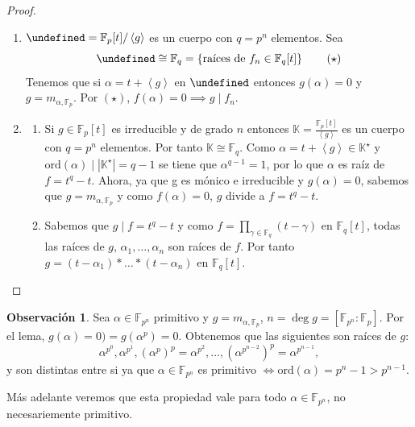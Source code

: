 \documentclass[10pt, spanish]{report}
\theoremstyle{definition}
\newtheorem*{obs}{Observación}
\newcommand{\F}{\mathbb{F}}
\newcommand{\K}{\mathbb{K}}
\let\L\undefined
\newcommand{\L}{\mathbb{L}}
\newcommand{\ord}[1]{\text{ord}(#1)}
\newcommand{\fecha}[1]{\marginpar{\underline{\footnotesize{#1}}}}
\begin{document}
\begin{proof}\hspace{0pt}
    \begin{enumerate}
        \item  $\L=\F_p[t]/\left<g\right>$  es un cuerpo con $q=p^n$ elementos.
            Sea
            \begin{equation}
                \L\cong\F_q=\left\{ \text{raíces de }f_n\in\F_q[t]\right\}
                \tag{$\star$}
            \end{equation}
            Tenemos que si $\alpha=t+\left< g \right> $ en $\L$ entonces
            $g(\alpha)=0$ y $g=m_{\alpha,\F_p}$. Por $\left( \star \right)$,
            $f(\alpha)=0\implies g\mid f_n$.
        \item
            \begin{enumerate}
                \item Si $g\in\F_p[t]$ es irreducible y de grado $n$ entonces $\K=
                    \frac{\F_p[t]}{\left< g \right>}$ es un cuerpo con $q=p^n$
                    elementos. Por tanto $\K\cong\F_q$.
                    Como $\alpha=t+\left< g \right>\in\K^\star$ y
                    $\ord{\alpha}\mid\left| \K^\star\right|=q-1$ se tiene que
                    $\alpha^{q-1}=1$, por lo que $\alpha$ es raíz de $f=t^q-t$.
                    Ahora, ya que g es mónico e irreducible y $g(\alpha)=0$,
                    sabemos que $g=m_{\alpha,\F_p}$ y como $f(\alpha)=0$, $g$
                    divide a $f=t^q-t$.
                \item Sabemos que $g\mid f=t^q-t$ y como $f=\prod_{\gamma\in\F_q}(t-\gamma)$ en $\F_q[t]$,
                    todas las raíces de $g$, $\alpha_1,\ldots,\alpha_n$ son
                    raíces de $f$. Por tanto
                    $g=(t-\alpha_1)*\ldots*(t-\alpha_n)$ en $\F_q[t]$.
            \end{enumerate}
    \end{enumerate}
    \vspace{-1.75em}
\end{proof}

\fecha{18/03} %
\begin{obs}
    Sea $\alpha\in\F_{p^n}$ primitivo y $g=m_{\alpha,\F_p}$, $n=\deg{g}=\left[
    \F_{p^n}:\F_p\right]$. Por el lema, $g(\alpha)=0)=g(\alpha^p)=0$. Obtenemos
    que las siguientes son raíces de $g$: \[\alpha^{p^0},\alpha^{p^1},(\alpha^p)^p=
    \alpha^{p^2},\ldots,\left(\alpha^{p^{n-2}}\right)^p=\alpha^{p^{n-1}},\]
    y son distintas entre si ya que $\alpha\in\F_{p^{n}}$ es primitivo
    $\Leftrightarrow \ord{\alpha}=p^n-1>p^{n-1}$.

    Más adelante veremos que esta propiedad vale para todo $\alpha\in\F_{p^n}$,
    no necesariemente primitivo.
\end{obs}
\end{document}
